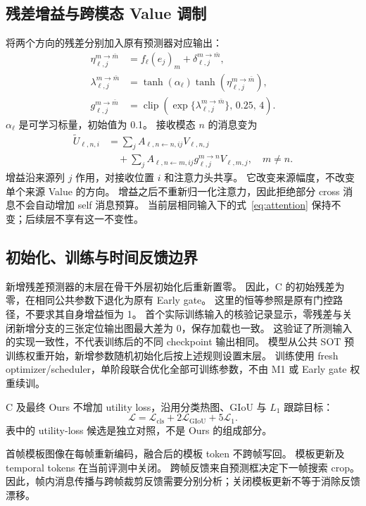 \documentclass[journal]{IEEEtran}
\newcommand{\clip}{\operatorname{clip}}
\begin{document}
\subsection{残差增益与跨模态 Value 调制}
将两个方向的残差分别加入原有预测器对应输出：
\begin{align}
 \eta_{\ell,j}^{m\to\bar m}
   &=f_\ell(e_j)_m+\delta_{\ell,j}^{m\to\bar m},\\
 \lambda_{\ell,j}^{m\to\bar m}
   &=\tanh(\alpha_\ell)\tanh(\eta_{\ell,j}^{m\to\bar m}),\\
 g_{\ell,j}^{m\to\bar m}
   &=\clip\!\left(\exp\{\lambda_{\ell,j}^{m\to\bar m}\},\,0.25,\,4\right).
 \label{eq:gain}
\end{align}
$\alpha_\ell$ 是可学习标量，初始值为 0.1。
接收模态 $n$ 的消息变为
\begin{align}
 \widetilde U_{\ell,n,i}
 &=\sum_j A_{\ell,n\leftarrow n,ij}V_{\ell,n,j}\nonumber\\
 &\quad+\sum_j A_{\ell,n\leftarrow m,ij}
           g_{\ell,j}^{m\to n}V_{\ell,m,j},\quad m\ne n.
 \label{eq:message}
\end{align}
增益沿来源列 $j$ 作用，对接收位置 $i$ 和注意力头共享。
它改变来源幅度，不改变单个来源 Value 的方向。
增益之后不重新归一化注意力，因此拒绝部分 cross 消息不会自动增加 self 消息预算。
当前层相同输入下的式~\eqref{eq:attention} 保持不变；后续层不享有这一不变性。

\subsection{初始化、训练与时间反馈边界}
新增残差预测器的末层在骨干外层初始化后重新置零。
因此，C 的初始残差为零，在相同公共参数下退化为原有 Early gate。
这里的恒等参照是原有门控路径，不要求其自身增益恒为 1。
首个实际训练输入的核验记录显示，零残差与关闭新增分支的三张定位输出图最大差为 0，保存加载也一致。
这验证了所测输入的实现一致性，不代表训练后的不同 checkpoint 输出相同。
模型从公共 SOT 预训练权重开始，新增参数随机初始化后按上述规则设置末层。
训练使用 fresh optimizer/scheduler，单阶段联合优化全部可训练参数，不由 M1 或 Early gate 权重续训。

C 及最终 Ours 不增加 utility loss，沿用分类热图、GIoU 与 $L_1$ 跟踪目标：
\begin{equation}
 \mathcal L=\mathcal L_{\mathrm{cls}}
               +2\mathcal L_{\mathrm{GIoU}}+5\mathcal L_{1}.
\end{equation}
表中的 utility-loss 候选是独立对照，不是 Ours 的组成部分。

首帧模板图像在每帧重新编码，融合后的模板 token 不跨帧写回。
模板更新及 temporal tokens 在当前评测中关闭。
跨帧反馈来自预测框决定下一帧搜索 crop。
因此，帧内消息传播与跨帧裁剪反馈需要分别分析；关闭模板更新不等于消除反馈漂移。
\end{document}
